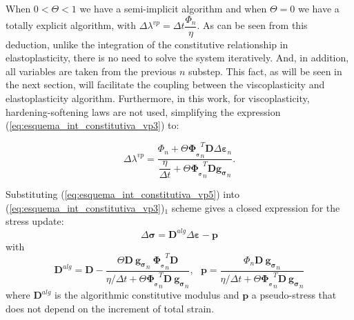 \documentclass[Journal,letterpaper]{ascelike-new}
\newcommand{\dgds}{\boldsymbol{g_\sigma}}
\newcommand{\dPhidsl}{\boldsymbol{\Phi_{_\sigma}}}
\newcommand{\Dsdee}{\boldsymbol{D}}
\newcommand{\strain}{\boldsymbol{\varepsilon}}
\newcommand{\stress}{\boldsymbol{\sigma}}
\begin{document}
When $0 < \Theta < 1$ we have a semi-implicit algorithm and when $\Theta = 0$ we have a totally explicit algorithm, with $\Delta \lambda^{vp} = \Delta t \dfrac{\Phi_n}{\eta}$. As can be seen from this deduction, unlike the integration of the constitutive relationship in elastoplasticity, there is no need to solve the system iteratively. And, in addition, all variables are taken from the previous $n$ substep. This fact, as will be seen in the next section, will facilitate the coupling between the viscoplasticity and elastoplasticity algorithm. Furthermore, in this work, for viscoplasticity, hardening-softening laws are not used, simplifying the expression (\ref{eq:esquema_int_constitutiva_vp3}) to:

\begin{equation}
	\label{eq:esquema_int_constitutiva_vp5}
	\Delta \lambda^{vp} = \dfrac{\Phi_n + \Theta \dPhidsl_n^T\Dsdee\Delta\strain_n}{\dfrac{\eta}{\Delta t} + \Theta \dPhidsl_n^T\Dsdee\dgds_n}.
\end{equation}

Substituting (\ref{eq:esquema_int_constitutiva_vp5}) into (\ref{eq:esquema_int_constitutiva_vp3})$_1$ scheme gives a closed expression for the stress update:
\begin{equation}
	\label{eq:esquema_int_constitutiva_vp6}
	\Delta \stress = \Dsdee^{alg} \Delta \strain - \boldsymbol p
\end{equation}
with
\begin{equation}
	\label{eq:esquema_int_constitutiva_vp6}
	\Dsdee^{alg} = \Dsdee - \dfrac{\Theta \Dsdee~\dgds_n~\dPhidsl_n^T \Dsdee}{\eta/\Delta t+ \Theta \dPhidsl_n^T\Dsdee~\dgds_n},~~~\boldsymbol p = \dfrac{\Phi_n \Dsdee ~\dgds_n}{\eta/\Delta t+ \Theta \dPhidsl_n^T\Dsdee~\dgds_n}
\end{equation}
where $\Dsdee^{alg}$ is the algorithmic constitutive modulus and $\boldsymbol p$ a pseudo-stress that does not depend on the increment of total strain.
\end{document}

